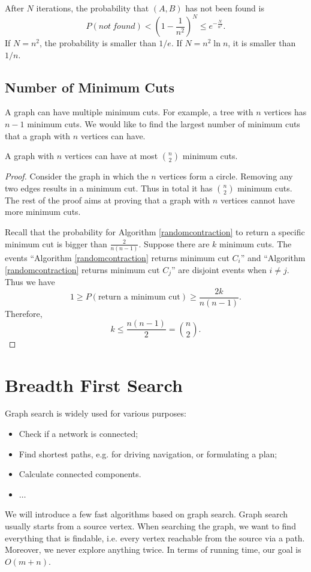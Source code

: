 After $N$ iterations, the probability that $(A,B)$ has not been found is 
\begin{equation*}
P(not\:found)<\left(1-\frac{1}{n^2}\right)^N\leq e^{-\frac{N}{n^2}}.
\end{equation*}
If $N=n^2$, the probability is smaller than $1/e$. If $N=n^2\ln n$, it is smaller than $1/n$. 
\subsection{Number of Minimum Cuts}
A graph can have multiple minimum cuts. For example, a tree with $n$ vertices has $n-1$ minimum cuts. We would like to find the largest number of minimum cuts that a graph with $n$ vertices can have.
\begin{theorem}
A graph with $n$ vertices can have at most $\binom{n}{2}$ minimum cuts.
\end{theorem}
\begin{proof}
Consider the graph in which the $n$ vertices form a circle. Removing any two edges results in a minimum cut. Thus in total it has $\binom{n}{2}$ minimum cuts. The rest of the proof aims at proving that a graph with $n$ vertices cannot have more minimum cuts.

Recall that the probability for Algorithm \ref{randomcontraction} to return a specific minimum cut is bigger than $\frac{2}{n(n-1)}$. Suppose there are $k$ minimum cuts. The events ``Algorithm \ref{randomcontraction} returns minimum cut $C_i$'' and  ``Algorithm \ref{randomcontraction} returns minimum cut $C_j$'' are disjoint events when $i\neq j$. Thus we have 
$$1\geq P(\text{return a minimum cut})\geq\frac{2k}{n(n-1)}.$$
Therefore, 
$$k\leq \frac{n(n-1)}{2}=\binom{n}{2}.$$
\end{proof}
\section{Breadth First Search}
Graph search is widely used for various purposes:
\begin{itemize}
\item Check if a network is connected;
\item Find shortest paths, e.g. for driving navigation, or formulating a plan;
\item Calculate connected components.
\item $\dots$
\end{itemize}
We will introduce a few fast algorithms based on graph search. Graph search usually starts from a source vertex. When searching the graph, we want to find everything that is findable, i.e. every vertex reachable from the source via a path. Moreover, we never explore anything twice. In terms of running time, our goal is $O(m+n).$ 

